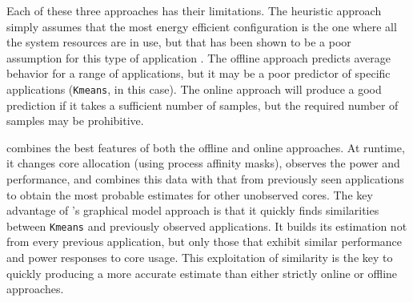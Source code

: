 Each of these three approaches has their limitations.  The heuristic
approach simply assumes that the most energy efficient configuration
is the one where all the system resources are in use, but that has
been shown to be a poor assumption for this type of application
\cite{HotPower,MeisnerISCA2011}.  The offline approach predicts
average behavior for a range of applications, but it may be a poor
predictor of specific applications (\texttt{Kmeans}, in this case).  The online
approach will produce a good prediction if it takes a sufficient
number of samples, but the required number of samples may be
prohibitive.

\SYSTEM{} combines the best features of both the offline and online
approaches.  At runtime, it changes core allocation (using process
affinity masks), observes the power and performance, and combines this
data with that from previously seen applications to obtain the most
probable estimates for other unobserved cores.  
The key advantage of \SYSTEM{}'s graphical model approach is
that it quickly finds similarities between \texttt{Kmeans} and previously
observed applications.  It builds its estimation not from every
previous application, but only those that exhibit similar performance
and power responses to core usage.  This exploitation of similarity is
the key to quickly producing a more accurate estimate than either
strictly online or offline approaches.


